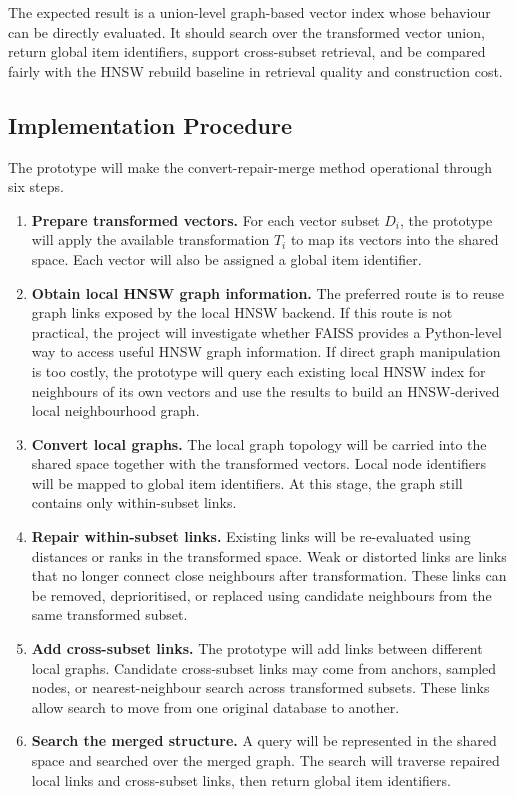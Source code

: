 \documentclass[11pt]{article}
\begin{document}
The expected result is a union-level graph-based vector index whose behaviour can be directly evaluated. It should search over the transformed vector union, return global item identifiers, support cross-subset retrieval, and be compared fairly with the HNSW rebuild baseline in retrieval quality and construction cost.

\subsection{Implementation Procedure}

The prototype will make the convert-repair-merge method operational through six steps.

\begin{enumerate}
\item \textbf{Prepare transformed vectors.} For each vector subset \(D_i\), the prototype will apply the available transformation \(T_i\) to map its vectors into the shared space. Each vector will also be assigned a global item identifier.
\item \textbf{Obtain local HNSW graph information.} The preferred route is to reuse graph links exposed by the local HNSW backend. If this route is not practical, the project will investigate whether FAISS provides a Python-level way to access useful HNSW graph information. If direct graph manipulation is too costly, the prototype will query each existing local HNSW index for neighbours of its own vectors and use the results to build an HNSW-derived local neighbourhood graph.
\item \textbf{Convert local graphs.} The local graph topology will be carried into the shared space together with the transformed vectors. Local node identifiers will be mapped to global item identifiers. At this stage, the graph still contains only within-subset links.
\item \textbf{Repair within-subset links.} Existing links will be re-evaluated using distances or ranks in the transformed space. Weak or distorted links are links that no longer connect close neighbours after transformation. These links can be removed, deprioritised, or replaced using candidate neighbours from the same transformed subset.
\item \textbf{Add cross-subset links.} The prototype will add links between different local graphs. Candidate cross-subset links may come from anchors, sampled nodes, or nearest-neighbour search across transformed subsets. These links allow search to move from one original database to another.
\item \textbf{Search the merged structure.} A query will be represented in the shared space and searched over the merged graph. The search will traverse repaired local links and cross-subset links, then return global item identifiers.
\end{enumerate}
\end{document}
